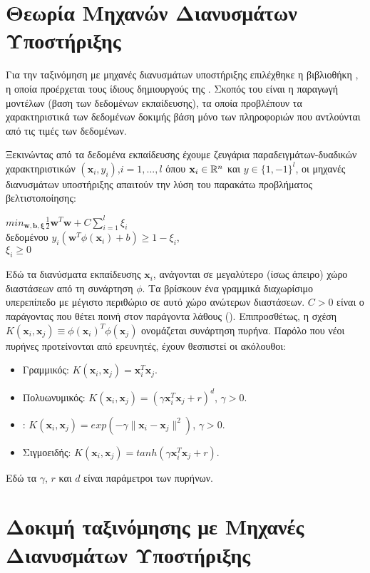 \section{Θεωρία Μηχανών Διανυσμάτων Υποστήριξης}
Για την ταξινόμηση με μηχανές διανυσμάτων υποστήριξης επιλέχθηκε η βιβλιοθήκη , η οποία προέρχεται τους ίδιους δημιουργούς της . Σκοπός του  είναι η παραγωγή μοντέλων (βαση των δεδομένων εκπαίδευσης), τα οποία προβλέπουν τα χαρακτηριστικά των δεδομένων δοκιμής βάση μόνο των πληροφοριών που αντλούνται από τις τιμές των δεδομένων.\par
Ξεκινώντας από τα δεδομένα εκπαίδευσης έχουμε ζευγάρια παραδειγμάτων-δυαδικών χαρακτηριστικών $(\mathbf{x}_i,y_i)$,$i=1,...,l$ όπου $\mathbf{x}_i\in\mathbb{R}^n$ και $y\in\{1,-1\}^l$, οι μηχανές διανυσμάτων  υποστήριξης  απαιτούν την λύση του παρακάτω προβλήματος βελτιστοποίησης:
\begin{center}
$min_{\mathbf{w},\mathbf{b},\mathbf{\xi}} \frac{1}{2}\mathbf{w}^T\mathbf{w}+C\sum_{i=1}^l\xi_i$\\
δεδομένου $y_i(\mathbf{w}^T\phi(\mathbf{x}_i)+b)\geq 1-\xi_i$,\\
$\xi_i \geq 0$
\end{center}
Εδώ τα διανύσματα εκπαίδευσης $\mathbf{x}_i$, ανάγονται σε μεγαλύτερο (ίσως άπειρο) χώρο διαστάσεων από τη συνάρτηση $\phi$. Τα  βρίσκουν ένα γραμμικά διαχωρίσιμο υπερεπίπεδο με μέγιστο περιθώριο σε αυτό χώρο ανώτερων διαστάσεων. $C>0$ είναι ο παράγοντας που θέτει ποινή στον παράγοντα λάθους (). Επιπροσθέτως, η σχέση $K(\mathbf{x}_i,\mathbf{x}_j)\equiv \phi(\mathbf{x}_i)^T\phi(\mathbf{x}_j)$ ονομάζεται συνάρτηση πυρήνα. Παρόλο που νέοι πυρήνες προτείνονται από ερευνητές, έχουν θεσπιστεί οι ακόλουθοι:
\begin{itemize}
\item Γραμμικός: $K(\mathbf{x}_i,\mathbf{x}_j)= \mathbf{x}_i^T\mathbf{x}_j$.
\item Πολυωνυμικός: $K(\mathbf{x}_i,\mathbf{x}_j)= (\gamma\mathbf{x}_i^T\mathbf{x}_j+r)^d$, $\gamma>0$.
\item {}: $K(\mathbf{x}_i,\mathbf{x}_j)= exp(-\gamma\|\mathbf{x}_i-\mathbf{x}_j\|^2)$, $\gamma>0$.
\item Σιγμοειδής: $K(\mathbf{x}_i,\mathbf{x}_j)= tanh(\gamma\mathbf{x}_i^T\mathbf{x}_j +r)$.
\end{itemize}
Εδώ τα $\gamma$, $r$ και $d$ είναι παράμετροι των πυρήνων.
\section{Δοκιμή ταξινόμησης με Μηχανές Διανυσμάτων Υποστήριξης}
